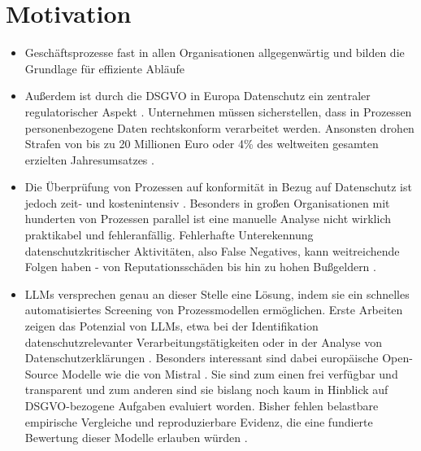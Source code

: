 \section{Motivation}\label{sec:motivation}

\begin{itemize}
    \item Geschäftsprozesse fast in allen Organisationen allgegenwärtig und bilden die Grundlage für effiziente Abläufe
    \item Außerdem ist durch die \ac{DSGVO} in Europa Datenschutz ein zentraler regulatorischer Aspekt \cite{Capodieci2023BPMNEnabledDP, GDPR2016}. Unternehmen müssen sicherstellen, dass in Prozessen personenbezogene Daten rechtskonform verarbeitet werden. Ansonsten drohen Strafen von bis zu 20 Millionen Euro oder 4\% des weltweiten gesamten erzielten Jahresumsatzes \cite{GDPR2016}.
    \item Die Überprüfung von Prozessen auf konformität in Bezug auf Datenschutz ist jedoch zeit- und kostenintensiv \cite{nake2023towards, varela2025business}. Besonders in großen Organisationen mit hunderten von Prozessen parallel ist eine manuelle Analyse nicht wirklich praktikabel und fehleranfällig. Fehlerhafte Unterekennung datenschutzkritischer Aktivitäten, also False Negatives, kann weitreichende Folgen haben - von Reputationsschäden bis hin zu hohen Bußgeldern \cite{nake2023towards}.
    \item \acp{LLM} versprechen genau an dieser Stelle eine Lösung, indem sie ein schnelles automatisiertes Screening von Prozessmodellen ermöglichen. Erste Arbeiten zeigen das Potenzial von \acp{LLM}, etwa bei der Identifikation datenschutzrelevanter Verarbeitungstätigkeiten oder in der Analyse von Datenschutzerklärungen \cite{ciaramella2022leveraging, pragyan2024toward}. Besonders interessant sind dabei europäische Open-Source Modelle wie die von Mistral \cite{mistralai}. Sie sind zum einen frei verfügbar und transparent und zum anderen sind sie bislang noch kaum in Hinblick auf \ac{DSGVO}-bezogene Aufgaben evaluiert worden. Bisher fehlen belastbare empirische Vergleiche und reproduzierbare Evidenz, die eine fundierte Bewertung dieser Modelle erlauben würden \cite{schwerin2024systematic}.
\end{itemize}